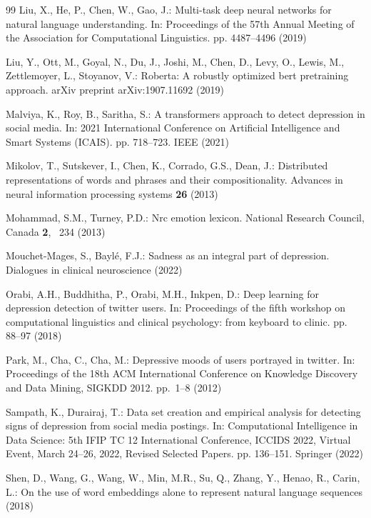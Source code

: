 \documentclass[runningheads]{llncs}
\begin{document}
\begin{thebibliography}{99}
Liu, X., He, P., Chen, W., Gao, J.: Multi-task deep neural networks for natural
  language understanding. In: Proceedings of the 57th Annual Meeting of the
  Association for Computational Linguistics. pp. 4487--4496 (2019)

Liu, Y., Ott, M., Goyal, N., Du, J., Joshi, M., Chen, D., Levy, O., Lewis, M.,
  Zettlemoyer, L., Stoyanov, V.: Roberta: A robustly optimized bert pretraining
  approach. arXiv preprint arXiv:1907.11692  (2019)

Malviya, K., Roy, B., Saritha, S.: A transformers approach to detect depression
  in social media. In: 2021 International Conference on Artificial Intelligence
  and Smart Systems (ICAIS). pp. 718--723. IEEE (2021)

Mikolov, T., Sutskever, I., Chen, K., Corrado, G.S., Dean, J.: Distributed
  representations of words and phrases and their compositionality. Advances in
  neural information processing systems  \textbf{26} (2013)

Mohammad, S.M., Turney, P.D.: Nrc emotion lexicon. National Research Council,
  Canada  \textbf{2}, ~234 (2013)

Mouchet-Mages, S., Bayl{\'e}, F.J.: Sadness as an integral part of depression.
  Dialogues in clinical neuroscience  (2022)

Orabi, A.H., Buddhitha, P., Orabi, M.H., Inkpen, D.: Deep learning for
  depression detection of twitter users. In: Proceedings of the fifth workshop
  on computational linguistics and clinical psychology: from keyboard to
  clinic. pp. 88--97 (2018)

Park, M., Cha, C., Cha, M.: Depressive moods of users portrayed in twitter. In:
  Proceedings of the 18th ACM International Conference on Knowledge Discovery
  and Data Mining, SIGKDD 2012. pp.~1--8 (2012)

Sampath, K., Durairaj, T.: Data set creation and empirical analysis for
  detecting signs of depression from social media postings. In: Computational
  Intelligence in Data Science: 5th IFIP TC 12 International Conference, ICCIDS
  2022, Virtual Event, March 24--26, 2022, Revised Selected Papers. pp.
  136--151. Springer (2022)

Shen, D., Wang, G., Wang, W., Min, M.R., Su, Q., Zhang, Y., Henao, R., Carin,
  L.: On the use of word embeddings alone to represent natural language
  sequences  (2018)


\end{thebibliography}
\end{document}
